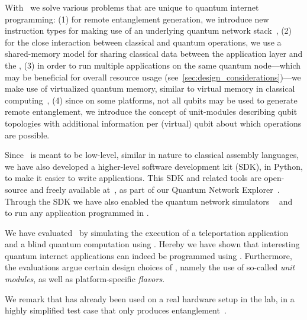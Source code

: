 With \netqasm\, we solve various problems that are unique to quantum internet programming:
    (1) for remote entanglement generation, we introduce new instruction types for making use of an underlying quantum network stack~\cite{dahlberg2019linklayer, kozlowski2020networklayer},
    (2) for the close interaction between classical and quantum operations, we use a shared-memory model for sharing classical data between the application layer and the \QNPU,
    (3) in order to run multiple applications on the same quantum node---which may be beneficial for overall resource usage (see~\cref{sec:design_considerations})---we make use of virtualized quantum memory, similar to virtual memory in classical computing~\cite{arpaci2018operating},
    (4) since on some platforms, not all qubits may be used to generate remote entanglement, we introduce the concept of unit-modules describing qubit topologies with additional information per (virtual) qubit about which operations are possible.

Since \netqasm\ is meant to be low-level, similar in nature to classical assembly languages, we have also developed a higher-level software development kit (SDK), in Python, to make it easier to write applications.
This SDK and related tools are open-source and freely available at~\cite{git_netqasm}, as part of our Quantum Network Explorer~\cite{qne_website}.
Through the SDK we have also enabled the quantum network simulators \netsquid~\cite{coopmans2021netsquid} and \simulaqron~\cite{dahlberg2018simulaqron} to run any application programmed in \netqasm.

We have evaluated \netqasm\ by simulating the execution of a teleportation application and a blind quantum computation using \netqasm.
Hereby we have shown that interesting quantum internet applications can indeed be programmed using \netqasm.
Furthermore, the evaluations argue certain design choices of \netqasm, namely the use of so-called \textit{unit modules}, as well as platform-specific
\textit{flavors}.

We remark that \netqasm has already been used on a real hardware setup in the lab, in a highly simplified test case that only produces entanglement~\cite{pompili2021experimental}.

